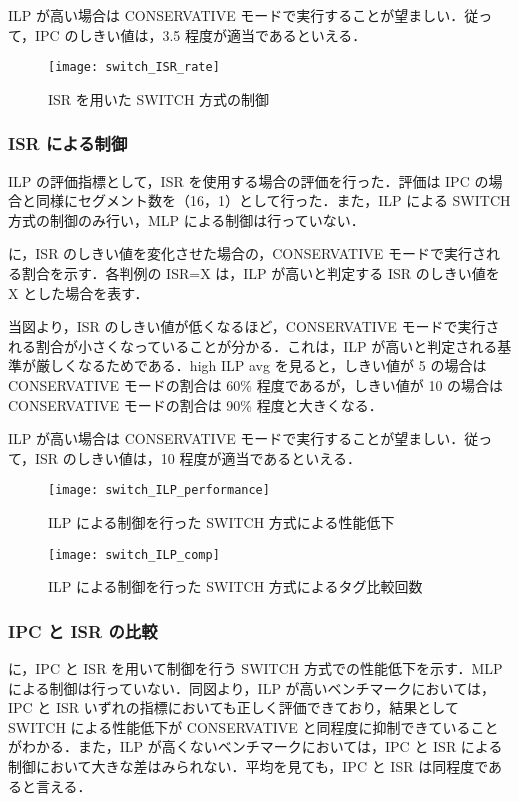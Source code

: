 ILP が高い場合は CONSERVATIVE モードで実行することが望ましい．従って，IPC のしきい値は，3.5 程度が適当であるといえる．

\begin{figure}[htb]
  \centering
  \texttt{[image: switch\_ISR\_rate]}
  \caption{ISR を用いた SWITCH 方式の制御}
  \label{fig:switch_ISR_rate}
\end{figure}

\subsubsection{ISR による制御}
ILP の評価指標として，ISR を使用する場合の評価を行った．評価は IPC の場合と同様にセグメント数を（16，1）として行った．また，ILP による SWITCH 方式の制御のみ行い，MLP による制御は行っていない．

に，ISR のしきい値を変化させた場合の，CONSERVATIVE モードで実行される割合を示す．各判例の ISR=X は，ILP が高いと判定する ISR のしきい値を X とした場合を表す．

当図より，ISR のしきい値が低くなるほど，CONSERVATIVE モードで実行される割合が小さくなっていることが分かる．これは，ILP が高いと判定される基準が厳しくなるためである．high ILP avg を見ると，しきい値が 5 の場合は CONSERVATIVE モードの割合は 60\% 程度であるが，しきい値が 10 の場合は CONSERVATIVE モードの割合は 90\% 程度と大きくなる．

ILP が高い場合は CONSERVATIVE モードで実行することが望ましい．従って，ISR のしきい値は，10 程度が適当であるといえる．

\begin{figure}[htb]
  \centering
  \texttt{[image: switch\_ILP\_performance]}
  \caption{ILP による制御を行った SWITCH 方式による性能低下}
  \label{fig:switch_ILP_performance}
\end{figure}

\begin{figure}[htb]
  \centering
  \texttt{[image: switch\_ILP\_comp]}
  \caption{ILP による制御を行った SWITCH 方式によるタグ比較回数}
  \label{fig:switch_ILP_comp}
\end{figure}

\subsubsection{IPC と ISR の比較}
に，IPC と ISR を用いて制御を行う SWITCH 方式での性能低下を示す．MLP による制御は行っていない．同図より，ILP が高いベンチマークにおいては，IPC と ISR いずれの指標においても正しく評価できており，結果として SWITCH による性能低下が CONSERVATIVE と同程度に抑制できていることがわかる．また，ILP が高くないベンチマークにおいては，IPC と ISR による制御において大きな差はみられない．平均を見ても，IPC と ISR は同程度であると言える．

